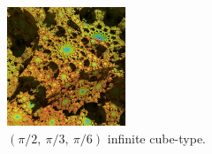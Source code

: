 \begin{figure}[h!tbp]
\begin{minipage}[t]{0.5\textwidth}
  \begin{minipage}[t]{0.24\textwidth}
  \centering
  \includegraphics[width=1.4in, height=1.4in, keepaspectratio]
   {./img/application/sphairahedron/variations/cube/limitType3.jpg}
  \end{minipage}
  \hspace*{\fill}
 \caption{$(\pi/2,~\pi/3,~\pi/6)$ infinite cube-type.}
 \label{fig:cube-236}
 \end{minipage}
\end{figure}

